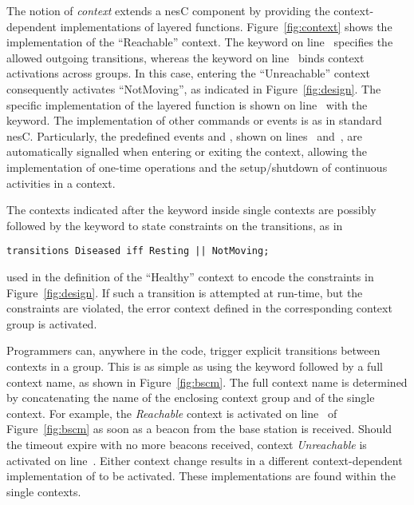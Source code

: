 The notion of \emph{context} extends a nesC component by providing the
context-dependent implementations of layered functions.
Figure~\ref{fig:context} shows the \conesc implementation of the
``Reachable'' context. The keyword  on
line~ specifies the allowed outgoing transitions,
whereas the keyword  on line~ binds
context activations across groups. In this case, entering the
``Unreachable'' context consequently activates ``NotMoving'', as
indicated in Figure~\ref{fig:design}. The specific implementation of
the layered function is shown on line~ with the
 keyword.  The implementation of other commands or
events is as in standard nesC. Particularly, the predefined events
 and , shown on
lines~ and~, are
automatically signalled when entering or exiting the context,
allowing the implementation of one-time operations and the
setup/shutdown of continuous activities in a context.

The contexts indicated after the  keyword inside
single contexts are possibly followed by the  keyword to
state constraints on the transitions, as in
\begin{lstlisting}[language=conesc]
transitions Diseased iff Resting || NotMoving;
\end{lstlisting}
used in the definition of the ``Healthy'' context to encode the
constraints in Figure~\ref{fig:design}. If such a transition is
attempted at run-time, but the constraints are violated, the error
context defined in the corresponding context group is activated. 



Programmers can, anywhere in the code, trigger explicit transitions
between contexts in a group. This is as simple as using the
 keyword followed by a full context name, as shown in
Figure~\ref{fig:bscm}. The full context name is determined by
concatenating the name of the enclosing context group and of the
single context. For example, the \emph{Reachable} context is activated
on line~ of Figure~\ref{fig:bscm} as soon as a beacon
from the base station is received. Should the timeout expire with no
more beacons received, context \emph{Unreachable} is activated on
line~. Either context change results in a different
context-dependent implementation of  to be
activated. These implementations are found within the single contexts.

